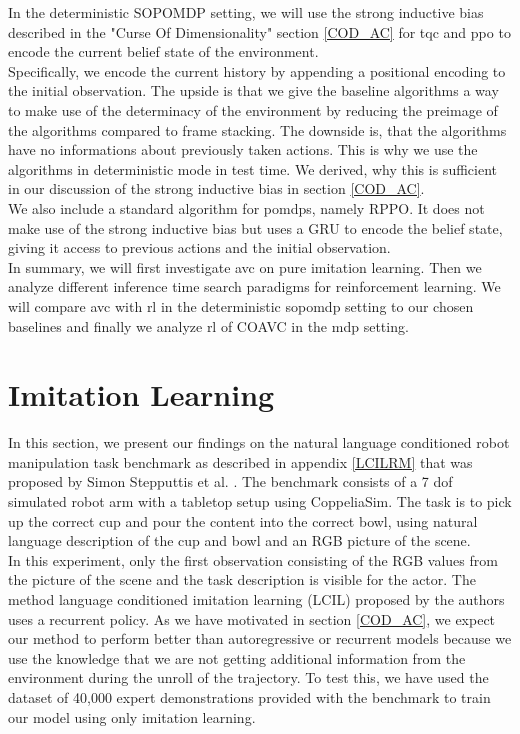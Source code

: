 In the deterministic SOPOMDP setting, we will use the strong inductive bias described in the "Curse Of Dimensionality" 
section \ref{COD_AC} for \ac{tqc} and \ac{ppo} to encode the current belief state of the environment. \\
Specifically, we encode the current history by appending a positional encoding to the initial observation. The upside is that we give 
the baseline algorithms a way to make use of the determinacy of the environment by reducing the preimage of the algorithms compared to 
frame stacking. The downside is, that the algorithms have no informations about previously taken actions. This is why we use the 
algorithms in deterministic mode in test time. We derived, why this is sufficient in our discussion of the strong inductive bias in 
section \ref{COD_AC}.\\

We also include a standard algorithm for \ac{pomdp}s, namely RPPO. It does not make use of the strong inductive bias but uses a GRU 
to encode the belief state, giving it access to previous actions and the initial observation.\\


In summary, we will first investigate \ac{avc} on pure imitation learning. Then we analyze different inference time search 
paradigms for reinforcement learning. We will compare \ac{avc} with \ac{rl} in the deterministic \ac{sopomdp} setting to our chosen baselines and finally we analyze 
\ac{rl} of COAVC in the \ac{mdp} setting.


\section{Imitation Learning}
\label{sec:exp_imi_lr}
In this section, we present our findings on the natural language conditioned robot manipulation task benchmark as described in appendix \ref{LCILRM} that was proposed by 
Simon Stepputtis et al. \cite{stepputtis2020languageconditioned}. The benchmark consists of a 7 dof simulated robot arm with a 
tabletop setup using CoppeliaSim. The task is to pick 
up the correct cup and pour the content into the correct bowl, using natural language description of the cup and bowl and an RGB 
picture of the scene.\\

In this experiment, only the first observation consisting of the RGB values from the picture of the 
scene and the task description is visible for the actor. The method language conditioned imitation learning (LCIL)
proposed by the authors uses a recurrent policy. As we have motivated in section \ref{COD_AC}, we expect our method to perform better than autoregressive or recurrent 
models because we use the knowledge that we are not getting additional information from the environment during the unroll of the trajectory. 
To test this, we have used the dataset of 40,000 expert demonstrations provided with the benchmark to train our model using only imitation learning.\\

